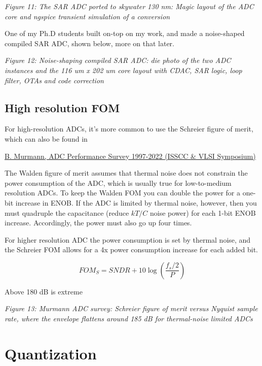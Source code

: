 \emph{Figure 11: The SAR ADC ported to skywater 130 nm: Magic layout of
the ADC core and ngspice transient simulation of a conversion}

One of my Ph.D students built on-top on my work, and made a noise-shaped
compiled SAR ADC, shown below, more on that later.


{
\centering
{}
}

\emph{Figure 12: Noise-shaping compiled SAR ADC: die photo of the two
ADC instances and the 116 um x 202 um core layout with CDAC, SAR logic,
loop filter, OTAs and code correction}

\subsection{High resolution FOM}\label{high-resolution-fom}

For high-resolution ADCs, it's more common to use the Schreier figure of
merit, which can also be found in

\href{https://web.stanford.edu/~murmann/adcsurvey.html}{B. Murmann, ADC
Performance Survey 1997-2022 (ISSCC \& VLSI Symposium)}

The Walden figure of merit assumes that thermal noise does not constrain
the power consumption of the ADC, which is usually true for
low-to-medium resolution ADCs. To keep the Walden FOM you can double the
power for a one-bit increase in ENOB. If the ADC is limited by thermal
noise, however, then you must quadruple the capacitance (reduce \(kT/C\)
noise power) for each 1-bit ENOB increase. Accordingly, the power must
also go up four times.

For higher resolution ADC the power consumption is set by thermal noise,
and the Schreier FOM allows for a 4x power consumption increase for each
added bit.

\[FOM_S = SNDR + 10\log\left(\frac{f_s/2}{P}\right)\]

Above 180 dB is extreme


{
\centering
{}
}

\emph{Figure 13: Murmann ADC survey: Schreier figure of merit versus
Nyquist sample rate, where the envelope flattens around 185 dB for
thermal-noise limited ADCs}

\section{Quantization}\label{quantization}

